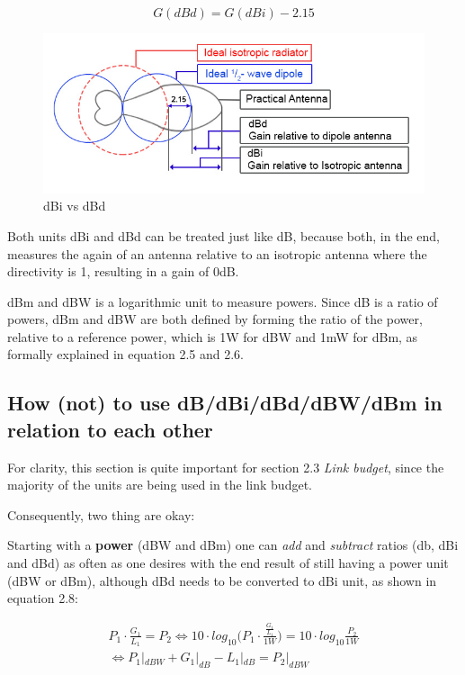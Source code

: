 \begin{equation}
    G(dBd) = G(dBi) - 2.15
\end{equation}

\begin{figure}[h]
\centering
\includegraphics[scale=0.8]{figures/DBIvsDBD.PNG}
\caption{dBi vs dBd \cite{EverythingRF}}
\end{figure}

Both units dBi and dBd can be treated just like dB, because both, in the end, measures the again of an antenna relative to an isotropic antenna where the directivity is 1, resulting in a gain of 0dB.  

dBm and dBW is a logarithmic unit to measure powers. Since dB is a ratio of powers, dBm and dBW are both defined by forming the ratio of the power, relative to a reference power, which is 1W for dBW and 1mW for dBm, as formally explained in equation 2.5 and 2.6.  

\subsection{How (not) to use dB/dBi/dBd/dBW/dBm in relation to each other}
For clarity, this section is quite important for section 2.3 \textit{Link budget}, since the majority of the units are being used in the link budget.

Consequently, two thing are okay: 

Starting with a \textbf{power} (dBW and dBm) one can \textit{add} and \textit{subtract} ratios (db, dBi and dBd) as often as one desires with the end result of still having a power unit (dBW or dBm), although dBd needs to be converted to dBi unit, as shown in equation 2.8: 

\begin{equation}
\begin{split}
    P_1 \cdot \frac{G_1}{L_1} = P_2 \Leftrightarrow 10 \cdot log_{10}\Big(P_1 \cdot \frac{\frac{G_1}{L_1}}{1W}\Big) = 10 \cdot log_{10} \frac{P_2}{1W}\\
    \Leftrightarrow P_1|_{dBW} + G_1|_{dB} - L_1|_{dB} = P_2|_{dBW}
\end{split}
\end{equation}

